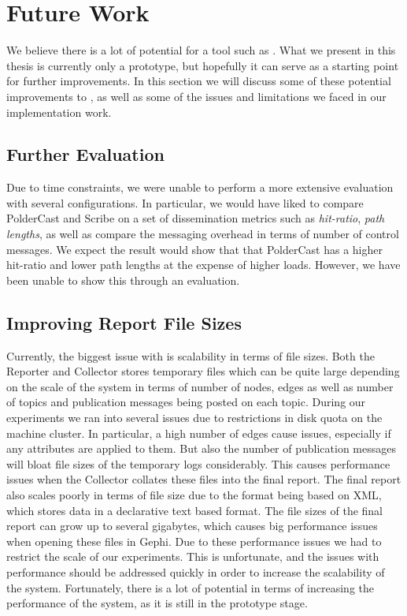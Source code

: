 \section{Future Work}

We believe there is a lot of potential for a tool such as \demo{}. What
we present in this thesis is currently only a prototype, but hopefully
it can serve as a starting point for further improvements. In this
section we will discuss some of these potential improvements to \demo{},
as well as some of the issues and limitations we faced in our implementation work.

\subsection{Further Evaluation}

Due to time constraints, we were unable to perform a more extensive
evaluation with several configurations. In particular, we would have
liked to compare PolderCast and Scribe on a set of dissemination metrics
such as \emph{hit-ratio}, \emph{path lengths}, as well as compare the messaging
overhead in terms of number of control messages. We expect the result
would show that that PolderCast has a higher hit-ratio and lower path
lengths at the expense of higher loads. However, we have been unable to
show this through an evaluation.

\subsection{Improving Report File Sizes}

Currently, the biggest issue with \demo{} is scalability in terms of
file sizes. Both the Reporter and Collector stores temporary files
which can be quite large depending on the scale of the system in terms
of number of nodes, edges as well as number of topics and publication
messages being posted on each topic. During our experiments we ran into
several issues due to restrictions in disk quota on the machine cluster.
In particular, a high number of edges cause issues, especially if any
attributes are applied to them. But also the number of publication
messages will bloat file sizes of the temporary logs considerably. This
causes performance issues when the Collector collates these files into
the final report. The final report also scales poorly in terms of file
size due to the \gexf{} format being based on XML, which stores data in
a declarative text based format. The file sizes of the final report can
grow up to several gigabytes, which causes big performance issues when
opening these files in Gephi. Due to these performance issues we had to
restrict the scale of our experiments. This is unfortunate, and the
issues with performance should be addressed quickly in order to increase
the scalability of the system. Fortunately, there is a lot of
potential in terms of increasing the performance of the system,
as it is still in the prototype stage.

